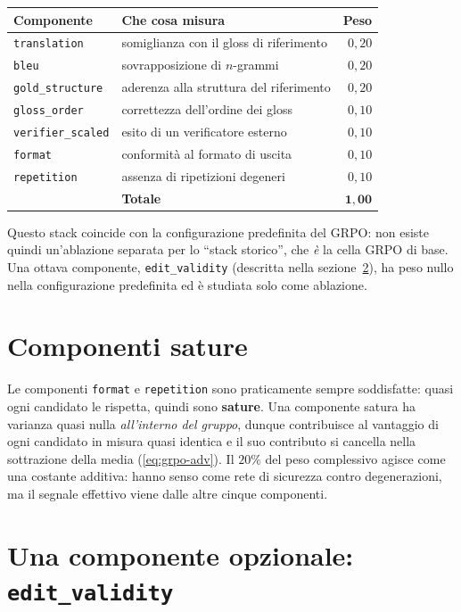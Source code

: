 \begin{center}
\begin{tabular}{llr}
\toprule
Componente & Che cosa misura & Peso \\
\midrule
\texttt{translation}     & somiglianza con il gloss di riferimento & $0{,}20$ \\
\texttt{bleu}            & sovrapposizione di $n$-grammi & $0{,}20$ \\
\texttt{gold\_structure} & aderenza alla struttura del riferimento & $0{,}20$ \\
\texttt{gloss\_order}    & correttezza dell'ordine dei gloss & $0{,}10$ \\
\texttt{verifier\_scaled} & esito di un verificatore esterno & $0{,}10$ \\
\texttt{format}          & conformità al formato di uscita & $0{,}10$ \\
\texttt{repetition}      & assenza di ripetizioni degeneri & $0{,}10$ \\
\midrule
& \textbf{Totale} & $\mathbf{1{,}00}$ \\
\bottomrule
\end{tabular}
\end{center}

Questo stack coincide con la configurazione predefinita del GRPO: non esiste
quindi un'ablazione separata per lo ``stack storico'', che \emph{è} la cella
GRPO di base. Una ottava componente, \texttt{edit\_validity} (descritta nella
sezione~\ref{sec:edit-validity}), ha peso nullo nella configurazione
predefinita ed è studiata solo come ablazione.

\section{Componenti sature}

Le componenti \texttt{format} e \texttt{repetition} sono praticamente sempre
soddisfatte: quasi ogni candidato le rispetta, quindi sono \textbf{sature}. Una
componente satura ha varianza quasi nulla \emph{all'interno del gruppo}, dunque
contribuisce al vantaggio di ogni candidato in misura quasi identica e il suo
contributo si cancella nella sottrazione della media (\eqref{eq:grpo-adv}). Il
$20\%$ del peso complessivo agisce come una costante additiva: hanno senso come
rete di sicurezza contro degenerazioni, ma il segnale effettivo viene dalle
altre cinque componenti.

\section{Una componente opzionale: \texttt{edit\_validity}}
\label{sec:edit-validity}

